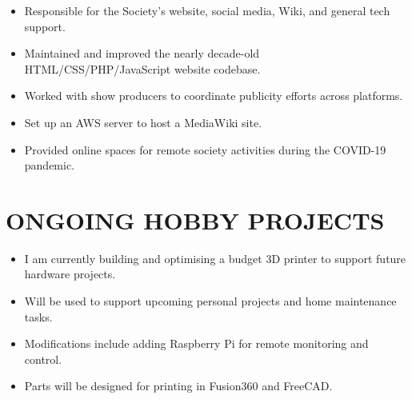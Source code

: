 
{
  {\begin{itemize}
    \item Responsible for the Society's website, social media, Wiki, and general tech support.
    \item Maintained and improved the nearly decade-old HTML/CSS/PHP/JavaScript website codebase.
    \item Worked with show producers to coordinate publicity efforts across platforms.
    \item Set up an AWS server to host a MediaWiki site.
    \item Provided online spaces for remote society activities during the COVID-19 pandemic. 
  \end{itemize}
  }
}

\section{ONGOING HOBBY PROJECTS}

{
  {\begin{itemize}
    \item I am currently building and optimising a budget 3D printer to support future hardware projects. 
    \item Will be used to support upcoming personal projects and home maintenance tasks.
    \item Modifications include adding Raspberry Pi for remote monitoring and control.
    \item Parts will be designed for printing in Fusion360 and FreeCAD.
  \end{itemize}
  }
}

